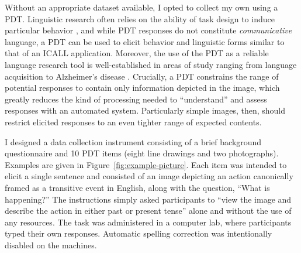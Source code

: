Without an appropriate dataset available, I opted to collect my own using a PDT. Linguistic research often relies on the ability of task design to induce particular behavior \citep{skehan1998assessing}, and while PDT responses do not constitute \textit{communicative} language, a PDT can be used to elicit behavior and linguistic forms similar to that of an ICALL application.  Moreover, the use of the PDT as a reliable language research tool is well-established in areas of study ranging from language acquisition to Alzheimer's disease \citep{ellis2000task,forbes2005detecting}. Crucially, a PDT constrains the range of potential responses to contain only information depicted in the image, which greatly reduces the kind of processing needed to ``understand'' and assess responses with an automated system. Particularly simple images, then, should restrict elicited responses to an even tighter range of expected contents.

I designed a data collection instrument consisting of a brief background questionnaire and 10 PDT items (eight line drawings and two photographs). Examples are given in Figure~\ref{fig:example-picture}. Each item was intended to elicit a single sentence and consisted of an image depicting an action canonically framed as a transitive event in English, along with the question, ``What is happening?'' The instructions simply asked participants to ``view the image and describe the action in either past or present tense'' alone and without the use of any resources. The task was administered in a computer lab, where participants typed their own responses. Automatic spelling correction was intentionally disabled on the machines.


